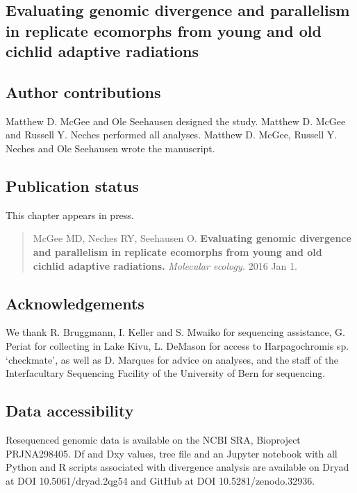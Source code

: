 \begin{refsection}

\chapter{Evaluating genomic divergence and parallelism in replicate ecomorphs from young and old cichlid adaptive radiations}


\section{Author contributions}

Matthew D. McGee and Ole Seehausen designed the study. Matthew D. McGee and Russell Y. Neches performed all analyses. Matthew D. McGee, Russell Y. Neches and Ole Seehausen wrote the manuscript.

\section{Publication status}

This chapter appears in press.

\begin{quote}
McGee MD, Neches RY, Seehausen O. {\bf Evaluating genomic divergence and parallelism in replicate ecomorphs from young and old cichlid adaptive radiations.} {\em Molecular ecology.} 2016 Jan 1.
\end{quote}







\section{Acknowledgements}

We thank R. Bruggmann, I. Keller and S. Mwaiko for sequencing assistance, G. Periat for collecting in Lake Kivu, L. DeMason for access to Harpagochromis sp. ‘checkmate’, as well as D. Marques for advice on analyses, and the staff of the Interfacultary Sequencing Facility of the University of Bern for sequencing.

\section{Data accessibility}

Resequenced genomic data is available on the NCBI SRA, Bioproject PRJNA298405. Df and Dxy values, tree file and an Jupyter notebook with all Python and R scripts associated with divergence analysis are available on Dryad at DOI 10.5061/dryad.2qg54 and GitHub at DOI 10.5281/zenodo.32936.

\printbibliography[heading=subbibliography]

\end{refsection}

